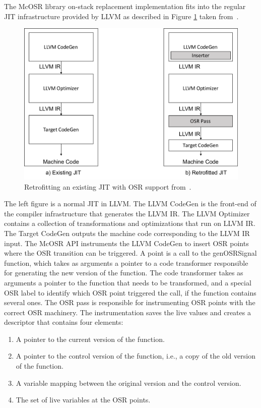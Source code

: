 The McOSR library on-stack replacement implementation fits into the regular JIT infrastructure provided by LLVM as described in Figure \ref{McOSRArchitecture} taken from~\cite{lameed2013modular}. 
\begin{figure}[h]
\centering
\includegraphics[scale=0.5]{Figures/MCJitArchitecture.pdf}
\decoRule
\caption[Retrofitting an existing JIT with OSR support]{Retrofitting an existing JIT with OSR support from~\cite{lameed2013modular}.}
\label{McOSRArchitecture}
\end{figure}
The left figure is a normal JIT in LLVM. 
The LLVM CodeGen is the front-end of the compiler infrastructure that generates the LLVM IR.
The LLVM Optimizer contains a collection of transformations and optimizations that run on LLVM IR. 
The Target CodeGen outputs the machine code corresponding to the LLVM IR input. 
The McOSR API instruments the LLVM CodeGen to insert OSR points where the OSR transition can be triggered. 
A point is a call to the genOSRSignal function, which takes as arguments a pointer to a code transformer responsible for generating the new version of the function.
The code transformer takes as arguments a pointer to the function that needs to be transformed, and a special OSR label to identify which OSR point triggered the call, if the function contains several ones.
The OSR pass is responsible for instrumenting OSR points with the correct OSR machinery.
The instrumentation saves the live values and creates a descriptor that contains four elements: 
\begin{enumerate}
    \item A pointer to the current version of the function. 
    \item A pointer to the control version of the function, i.e., a copy of the old version of the function.
    \item A variable mapping between the original version and the control version.
    \item The set of live variables at the OSR points. 
\end{enumerate}\\

